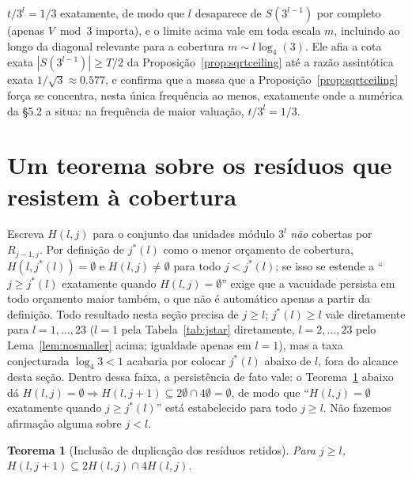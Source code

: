 \documentclass[11pt]{amsart}
\theoremstyle{plain}
\newtheorem{theorem}{Teorema}
\theoremstyle{definition}
\theoremstyle{remark}
\begin{document}
$t/3^l=1/3$ exatamente, de modo que $l$ desaparece de $S(3^{l-1})$ por completo (apenas $V\bmod3$
importa), e o limite acima vale em toda escala $m$, incluindo ao longo da diagonal relevante para a
cobertura $m\sim l\log_4(3)$. Ele afia a cota exata $|S(3^{l-1})|\ge T/2$ da
Proposição~\ref{prop:sqrtceiling} até a razão assintótica exata $1/\sqrt3\approx0.577$, e confirma
que a massa que a Proposição~\ref{prop:sqrtceiling} força se concentra, nesta única frequência ao
menos, exatamente onde a numérica da \S5.2 a situa: na frequência de maior valuação, $t/3^l=1/3$.

\section{Um teorema sobre os resíduos que resistem à cobertura}
\label{sec:holdouts}

Escreva $H(l,j)$ para o conjunto das unidades módulo $3^l$ \emph{não} cobertas por $R_{j-1,j}$. Por
definição de $j^*(l)$ como o menor orçamento de cobertura, $H(l,j^*(l))=\emptyset$ e $H(l,j)\ne\emptyset$
para todo $j<j^*(l)$; se isso se estende a ``$j\ge j^*(l)$ exatamente quando $H(l,j)=\emptyset$''
exige que a vacuidade persista em todo orçamento maior também, o que não é automático apenas a
partir da definição. Todo resultado nesta seção precisa de $j\ge l$; $j^*(l) \ge l$ vale
diretamente para $l=1,\dots,23$ ($l=1$ pela Tabela~\ref{tab:jstar} diretamente, $l=2,\dots,23$ pelo
Lema~\ref{lem:nosmaller} acima; igualdade apenas em $l=1$), mas a taxa conjecturada $\log_4 3 < 1$
acabaria por colocar $j^*(l)$ abaixo de $l$, fora do alcance desta seção. Dentro dessa faixa, a
persistência de fato vale: o Teorema~\ref{thm:doubling} abaixo dá
$H(l,j)=\emptyset\Rightarrow H(l,j+1)\subseteq2\emptyset\cap4\emptyset=\emptyset$, de modo que
``$H(l,j)=\emptyset$ exatamente quando $j\ge j^*(l)$'' está estabelecido para todo $j\ge l$. Não
fazemos afirmação alguma sobre $j<l$.

\begin{theorem}[Inclusão de duplicação dos resíduos retidos]
\label{thm:doubling}
Para $j \ge l$, $H(l,j+1) \subseteq 2H(l,j) \cap 4H(l,j)$.
\end{theorem}
\end{document}
